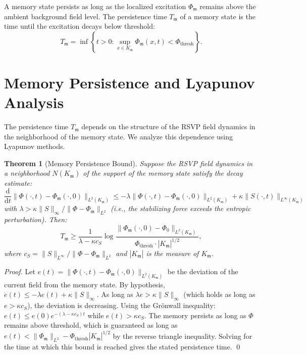 \documentclass[12pt, a4paper, openany]{book}
\theoremstyle{plain}
\newtheorem{theorem}{Theorem}[chapter]
\theoremstyle{definition}
\theoremstyle{remark}
\newcommand{\Sfield}{S}
\begin{document}
A memory state persists as long as the localized excitation $\Phi_\mathfrak{m}$ remains above the ambient background field level. The persistence time $T_\mathfrak{m}$ of a memory state is the time until the excitation decays below threshold:
\[
T_\mathfrak{m} = \inf\left\{t > 0 : \sup_{x \in K_\mathfrak{m}} \Phi_\mathfrak{m}(x, t) < \Phi_{\mathrm{thresh}}\right\}.
\]

\section{Memory Persistence and Lyapunov Analysis}

The persistence time $T_\mathfrak{m}$ depends on the structure of the RSVP field dynamics in the neighborhood of the memory state. We analyze this dependence using Lyapunov methods.

\begin{theorem}[Memory Persistence Bound]
Suppose the RSVP field dynamics in a neighborhood $N(K_\mathfrak{m})$ of the support of the memory state satisfy the decay estimate:
\[
\frac{\mathrm{d}}{\mathrm{d}t} \|\Phi(\cdot, t) - \Phi_\mathfrak{m}(\cdot, 0)\|_{L^2(K_\mathfrak{m})} \leq -\lambda \|\Phi(\cdot, t) - \Phi_\mathfrak{m}(\cdot, 0)\|_{L^2(K_\mathfrak{m})} + \kappa \|\Sfield(\cdot, t)\|_{L^\infty(K_\mathfrak{m})}
\]
with $\lambda > \kappa \|\Sfield\|_\infty / \|\Phi - \Phi_\mathfrak{m}\|_{L^2}$ (i.e., the stabilizing force exceeds the entropic perturbation). Then:
\[
T_\mathfrak{m} \geq \frac{1}{\lambda - \kappa c_S} \log \frac{\|\Phi_\mathfrak{m}(\cdot, 0) - \Phi_0\|_{L^2(K_\mathfrak{m})}}{\Phi_{\mathrm{thresh}} \cdot |K_\mathfrak{m}|^{1/2}},
\]
where $c_S = \|\Sfield\|_{L^\infty} / \|\Phi - \Phi_\mathfrak{m}\|_{L^2}$ and $|K_\mathfrak{m}|$ is the measure of $K_\mathfrak{m}$.
\end{theorem}

\begin{proof}
Let $e(t) = \|\Phi(\cdot, t) - \Phi_\mathfrak{m}(\cdot, 0)\|_{L^2(K_\mathfrak{m})}$ be the deviation of the current field from the memory state. By hypothesis, $\dot{e}(t) \leq -\lambda e(t) + \kappa \|\Sfield\|_\infty$. As long as $\lambda e > \kappa \|\Sfield\|_\infty$ (which holds as long as $e > \kappa c_S$), the deviation is decreasing. Using the Grönwall inequality: $e(t) \leq e(0) e^{-(\lambda - \kappa c_S)t}$ while $e(t) > \kappa c_S$. The memory persists as long as $\Phi$ remains above threshold, which is guaranteed as long as $e(t) < \|\Phi_\mathfrak{m}\|_{L^2} - \Phi_{\mathrm{thresh}} |K_\mathfrak{m}|^{1/2}$ by the reverse triangle inequality. Solving for the time at which this bound is reached gives the stated persistence time. \qed
\end{proof}
\end{document}
